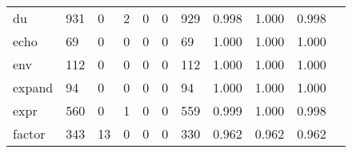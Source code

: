 \begin{longtable}{lp{1.2cm}p{1.2cm}p{1.2cm}p{1.2cm}p{1.2cm}p{1.2cm}p{1.2cm}p{1.2cm}p{1.2cm}p{1.2cm}}
du        &                                   931 &                                                  0 &                                                  2 &                                                  0 &                                                  0 &                                                929 &                                              0.998 &                                              1.000 &                                              0.998 \\
echo      &                                    69 &                                                  0 &                                                  0 &                                                  0 &                                                  0 &                                                 69 &                                              1.000 &                                              1.000 &                                              1.000 \\
env       &                                   112 &                                                  0 &                                                  0 &                                                  0 &                                                  0 &                                                112 &                                              1.000 &                                              1.000 &                                              1.000 \\
expand    &                                    94 &                                                  0 &                                                  0 &                                                  0 &                                                  0 &                                                 94 &                                              1.000 &                                              1.000 &                                              1.000 \\
expr      &                                   560 &                                                  0 &                                                  1 &                                                  0 &                                                  0 &                                                559 &                                              0.999 &                                              1.000 &                                              0.998 \\
factor    &                                   343 &                                                 13 &                                                  0 &                                                  0 &                                                  0 &                                                330 &                                              0.962 &                                              0.962 &                                              0.962 \\

\end{longtable}
